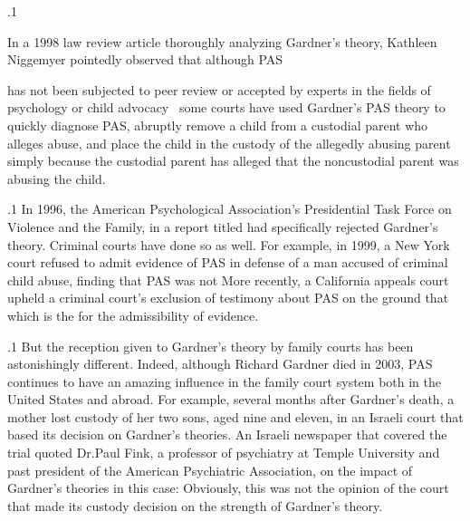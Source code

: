 \documentclass[11pt, twoside]{article}
\begin{document}
{\p.1{%
In a 1998 law review article thoroughly analyzing Gardner’s theory,
Kathleen Niggemyer pointedly observed that although PAS

\begin{blockQuote}
has not been subjected to peer review or accepted by experts in the
fields of psychology or child advocacy \ellThree{2pt}{2pt}\ some courts have used
Gardner’s PAS theory to quickly diagnose PAS, abruptly remove
a child from a custodial parent who alleges abuse, and place the
child in the custody of the allegedly abusing parent simply because
the custodial parent has alleged that the noncustodial parent was
abusing the child.
\end{blockQuote}

}%

\p.1{%
In 1996, the American Psychological Association’s Presidential Task
Force on Violence and the Family, in a report titled  had specifically rejected Gardner’s theory. Criminal courts have
done so as well. For example, in 1999, a New York court refused to admit evidence of PAS in defense of a man accused of criminal child abuse,
finding that PAS was not 
More recently, a California appeals court upheld a
criminal court’s exclusion of testimony about PAS on the ground that
which is the  for the admissibility of evidence.
}%

\p.1{%
But the reception given to Gardner’s theory by family courts has been
astonishingly different. Indeed, although Richard Gardner died in 2003, PAS
continues to have an amazing influence in the family court system both
in the United States and abroad. For example, several months after
Gardner’s death, a mother lost custody of her two sons, aged nine and
eleven, in an Israeli court that based its decision on Gardner’s theories.
An Israeli newspaper that covered the trial quoted Dr.\@ Paul Fink, a
professor of psychiatry at Temple University and past president of the
American Psychiatric Association, on the impact of Gardner’s theories
in this case:  Obviously,
this was not the opinion of the court that made its custody decision on
the strength of Gardner’s theory.
}%

}
\end{document}
